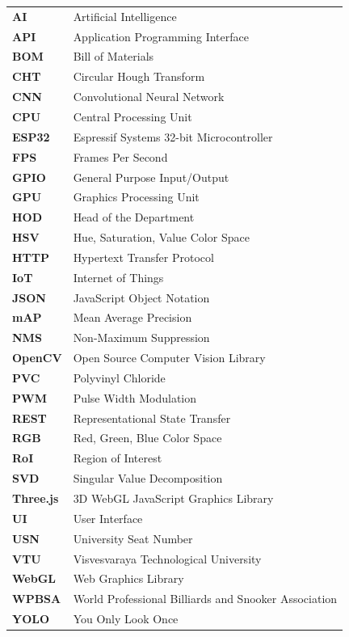 \begin{table}[H]
\centering
\begin{tabular}{ll}
    \textbf{AI}      & Artificial Intelligence \\
    \textbf{API}     & Application Programming Interface \\
    \textbf{BOM}     & Bill of Materials \\
    \textbf{CHT}     & Circular Hough Transform \\
    \textbf{CNN}     & Convolutional Neural Network \\
    \textbf{CPU}     & Central Processing Unit \\
    \textbf{ESP32}   & Espressif Systems 32-bit Microcontroller \\
    \textbf{FPS}     & Frames Per Second \\
    \textbf{GPIO}    & General Purpose Input/Output \\
    \textbf{GPU}     & Graphics Processing Unit \\
    \textbf{HOD}     & Head of the Department \\
    \textbf{HSV}     & Hue, Saturation, Value Color Space \\
    \textbf{HTTP}    & Hypertext Transfer Protocol \\
    \textbf{IoT}     & Internet of Things \\
    \textbf{JSON}    & JavaScript Object Notation \\
    \textbf{mAP}     & Mean Average Precision \\
    \textbf{NMS}     & Non-Maximum Suppression \\
    \textbf{OpenCV}  & Open Source Computer Vision Library \\
    \textbf{PVC}     & Polyvinyl Chloride \\
    \textbf{PWM}     & Pulse Width Modulation \\
    \textbf{REST}    & Representational State Transfer \\
    \textbf{RGB}     & Red, Green, Blue Color Space \\
    \textbf{RoI}     & Region of Interest \\
    \textbf{SVD}     & Singular Value Decomposition \\
    \textbf{Three.js}& 3D WebGL JavaScript Graphics Library \\
    \textbf{UI}      & User Interface \\
    \textbf{USN}     & University Seat Number \\
    \textbf{VTU}     & Visvesvaraya Technological University \\
    \textbf{WebGL}   & Web Graphics Library \\
    \textbf{WPBSA}   & World Professional Billiards and Snooker Association \\
    \textbf{YOLO}    & You Only Look Once \\
\end{tabular}
\end{table}
